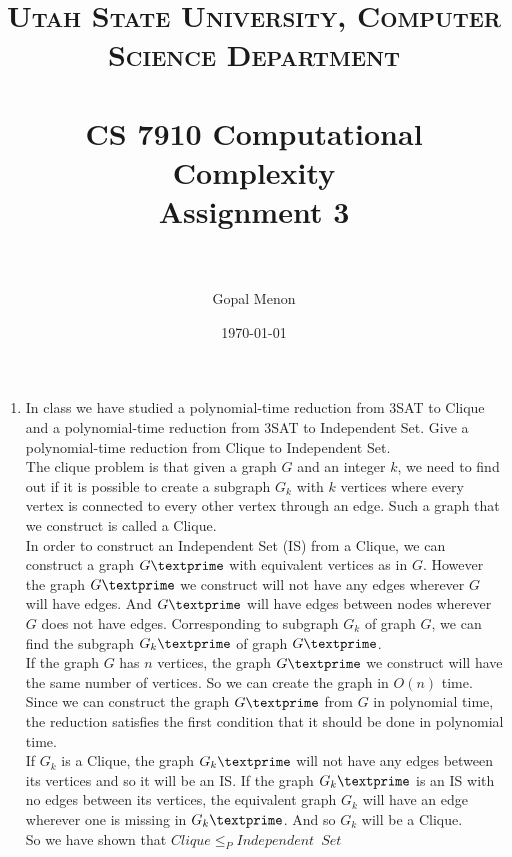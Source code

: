\documentclass[paper=a4, fontsize=11pt]{scrartcl} %
\title{	
\normalfont \normalsize 
\textsc{Utah State University, Computer Science Department} \\ [25pt] %
\horrule{0.5pt} \\[0.4cm] %
\huge CS 7910 Computational Complexity\\Assignment 3 \\ %
\horrule{2pt} \\[0.5cm] %
}
\author{Gopal Menon} %
\date{\normalsize\today} %
\numberwithin{equation}{section} %
\numberwithin{figure}{section} %
\numberwithin{table}{section} %
\begin{document}
\maketitle %

\begin{enumerate}
\item In class we have studied a polynomial-time reduction from 3SAT to Clique and a polynomial-time reduction from 3SAT to Independent Set. Give a polynomial-time reduction from Clique to Independent Set.\\

The clique problem is that given a graph $G$ and an integer $k$, we need to find out if it is possible to create a subgraph $G_k$ with $k$ vertices where every vertex is connected to every other vertex through an edge. Such a graph that we construct is called a Clique.\\

In order to construct an Independent Set (IS) from a Clique, we can construct a graph $G\textprime$ with equivalent vertices as in $G$. However the graph $G\textprime$ we construct will not have any edges wherever $G$ will have edges. And $G\textprime$ will have edges between nodes wherever $G$ does not have edges. Corresponding to subgraph $G_k$ of graph $G$, we can find the subgraph $G_k\textprime$ of graph $G\textprime$.\\

If the graph $G$ has $n$ vertices, the graph $G\textprime$ we construct will have the same number of vertices. So we can create the graph in $O(n)$ time. Since we can construct the graph $G\textprime$ from $G$ in polynomial time, the reduction satisfies the first condition that it should be done in polynomial time.\\

If $G_k$ is a Clique, the graph $G_k\textprime$ will not have any edges between its vertices and so it will be an IS. If the graph $G_k\textprime$ is an IS with no edges between its vertices, the equivalent graph $G_k$ will have an edge wherever one is missing in $G_k\textprime$. And so $G_k$ will be a Clique.\\

So we have shown that $Clique \leq_P Independent \enspace Set$


\end{enumerate}
\end{document}
